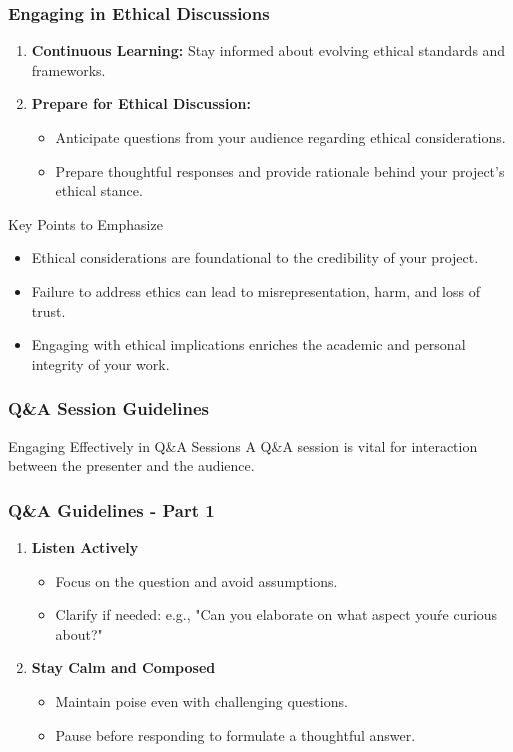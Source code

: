 \documentclass{beamer}
\begin{document}
\begin{frame}[fragile]
    \frametitle{Engaging in Ethical Discussions}
    \begin{enumerate}
        \item \textbf{Continuous Learning:} Stay informed about evolving ethical standards and frameworks. 
        \item \textbf{Prepare for Ethical Discussion:}
            \begin{itemize}
                \item Anticipate questions from your audience regarding ethical considerations.
                \item Prepare thoughtful responses and provide rationale behind your project's ethical stance.
            \end{itemize}
    \end{enumerate}
    
    \begin{block}{Key Points to Emphasize}
        \begin{itemize}
            \item Ethical considerations are foundational to the credibility of your project.
            \item Failure to address ethics can lead to misrepresentation, harm, and loss of trust.
            \item Engaging with ethical implications enriches the academic and personal integrity of your work.
        \end{itemize}
    \end{block}
\end{frame}

\begin{frame}[fragile]
    \frametitle{Q\&A Session Guidelines}
    \begin{block}{Engaging Effectively in Q\&A Sessions}
        A Q\&A session is vital for interaction between the presenter and the audience.
    \end{block}
\end{frame}

\begin{frame}[fragile]
    \frametitle{Q\&A Guidelines - Part 1}
    \begin{enumerate}
        \item \textbf{Listen Actively}
            \begin{itemize}
                \item Focus on the question and avoid assumptions.
                \item Clarify if needed: e.g., "Can you elaborate on what aspect you\'re curious about?"
            \end{itemize}
        \item \textbf{Stay Calm and Composed}
            \begin{itemize}
                \item Maintain poise even with challenging questions.
                \item Pause before responding to formulate a thoughtful answer.
            \end{itemize}
    \end{enumerate}
\end{frame}
\end{document}
